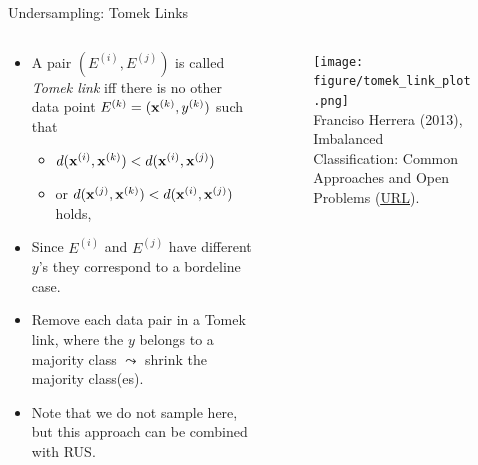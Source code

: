 \documentclass[11pt,compress,t,notes=noshow, xcolor=table]{beamer}
\begin{document}
 \begin{frame}{Undersampling: Tomek Links}
    \footnotesize{
        \begin{columns}
            \begin{column}{0.5\textwidth}
                \begin{itemize} 
                    \footnotesize
                    
                     \item A pair $(E^{(i)},E^{(j)})$ is called \emph{Tomek link} iff there is no other data point $E^{(k)} = (\mathbf{x}^{(k)},y^{(k)})$ such that
    
                    \begin{itemize} 
                    \footnotesize
                
                       \item [] $d(\mathbf{x}^{(i)}, \mathbf{x}^{(k)}) < d(\mathbf{x}^{(i)}, \mathbf{x}^{(j)}) $
                       \item [] or $d(\mathbf{x}^{(j)}, \mathbf{x}^{(k)}) < d(\mathbf{x}^{(i)}, \mathbf{x}^{(j)}) $ holds,
                    
                    \end{itemize}
                    \vspace{10pt}
                    
                    \item Since $E^{(i)}$ and $E^{(j)}$ have different $y$'s they correspond to a bordeline case.
                    \vspace{10pt}
				
                    \item Remove each data pair in a Tomek link, where the $y$ belongs to a majority class $\leadsto$ shrink the majority class(es).
                    \vspace{10pt}
    
                    \item Note that we do not sample here, but this approach can be combined with RUS.
                    \vspace{10pt}
                
                \end{itemize}
            \end{column}

            \begin{column}{0.4\textwidth}
                \begin{figure}
                    \centering
                    \texttt{[image: figure/tomek\_link\_plot.png]}	\tiny
                    \\ Franciso Herrera (2013), Imbalanced Classification: Common
                    Approaches and Open Problems (\href{https://sci2s.ugr.es/sites/default/files/files/TutorialsAndPlenaryTalks/SSTiC-Trends in-Classification-Imbalanced-data-sets.pdf}{\underline{URL}}).
                \end{figure}
            \end{column}
        \end{columns}
    }
 

 \end{frame}
	
\end{document}
